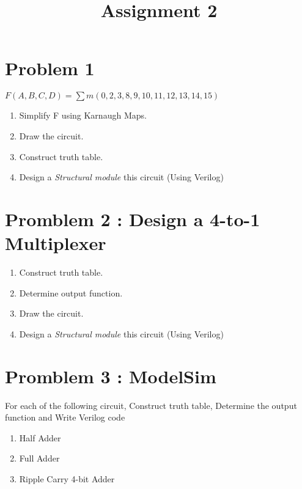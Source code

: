 \documentclass[12pt, letterpaper]{article}
\title{Assignment 2}
\author{}
\date{}
\begin{document}
\maketitle

\section*{Problem 1}
$F(A,B,C,D)=\sum m(0,2,3,8,9,10,11,12,13,14,15)$
\begin{enumerate}
    \item Simplify F using Karnaugh Maps.
    \item Draw the circuit.
    \item Construct truth table.
    \item Design a \emph{Structural module} this circuit (Using Verilog)
\end{enumerate}

\section*{Promblem 2 : Design a 4-to-1 Multiplexer }

\begin{enumerate}
    \item Construct truth table.
    \item Determine output function.
    \item Draw the circuit.
    \item Design a \emph{Structural module} this circuit (Using Verilog)
\end{enumerate}

\pagebreak
\section*{Promblem 3 : ModelSim}

For each of the following circuit, Construct truth table, Determine the output function and Write Verilog code 

\begin{enumerate}
    \item Half Adder
    \item Full Adder
    \item Ripple Carry 4-bit Adder
\end{enumerate}
\end{document}
